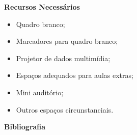 \begin{snugshade}\begin{center}\textbf{
    Recursos Necessários
    \vphantom{q} %
}\end{center}\end{snugshade}

\begin{itemize}
  \item Quadro branco;
  \item Marcadores para quadro branco;
  \item Projetor de dados multimídia;
  \item Espaços adequados para aulas extras;
  \item Mini auditório;
  \item Outros espaços circunstanciais.
\end{itemize}



\begin{snugshade}\begin{center}\textbf{
    Bibliografia
}\end{center}\end{snugshade}

